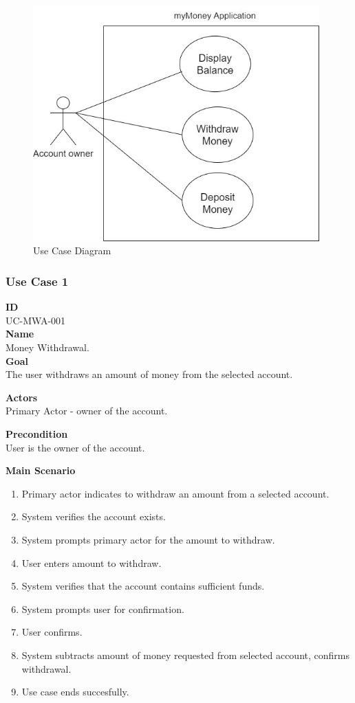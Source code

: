 \documentclass[12pt]{article}
\begin{document}
\begin{figure}[h!]
  \centering
  \includegraphics[width=110mm,natwidth=565,natheight=466]{use_case_diagram.jpg}
  \caption{Use Case Diagram}
  \label{fig:use_case_diagram}
\end{figure}

\subsubsection{Use Case 1} \label{uc:1}

\noindent
{\bf ID}\\
UC-MWA-001\\
    
\noindent
{\bf Name}\\
Money Withdrawal.\\

\noindent
{\bf Goal}\\
The user withdraws an amount of money from the selected account.

\noindent
{\bf Actors}\\
Primary Actor - owner of the account.

\noindent
{\bf Precondition}\\
User is the owner of the account.

\noindent
{\bf Main Scenario}\\
\vspace*{-0.2in}
\begin{enumerate}
  \item Primary actor indicates to withdraw an amount from a selected account.
  \item System verifies the account exists.
  \item System prompts primary actor for the amount to withdraw.
  \item User enters amount to withdraw.
  \item System verifies that the account contains sufficient funds.
  \item System prompts user for confirmation.
  \item User confirms.
  \item System subtracts amount of money requested from selected account, confirms withdrawal.
  \item Use case ends succesfully.
\end{enumerate}
\end{document}
